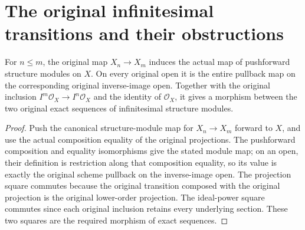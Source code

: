 \section{The original infinitesimal transitions and their obstructions}

\begin{lemma}
\label{lem:fc-infinitesimal-sequence-transitions}
\leanok
{}
For $n\leq m$, the original map $X_n\to X_m$ induces the actual map
of pushforward structure modules on $X$.  On every original open it is
the entire pullback map on the corresponding original inverse-image
open.  Together with the original inclusion
$I^m\mathcal O_X\to I^n\mathcal O_X$ and the identity of
$\mathcal O_X$, it gives a morphism between the two original exact
sequences of infinitesimal structure modules.
\end{lemma}
\begin{proof}
Push the canonical structure-module map for $X_n\to X_m$ forward to
$X$, and use the actual composition equality of the original
projections.  The pushforward composition and equality isomorphisms
give the stated module map; on an open, their definition is restriction
along that composition equality, so its value is exactly the original
scheme pullback on the inverse-image open.  The projection square
commutes because the original transition composed with the original
projection is the original lower-order projection.  The ideal-power
square commutes since each original inclusion retains every underlying
section.  These two squares are the required morphism of exact
sequences.
\end{proof}

